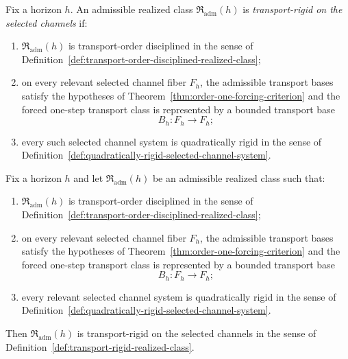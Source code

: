 \begin{definition}
\label{def:transport-rigid-realized-class}
Fix a horizon $h$. An admissible realized class
$\mathfrak R_{\mathrm{adm}}(h)$ is \emph{transport-rigid on the selected
channels} if:
\begin{enumerate}[label=(\roman*), leftmargin=2em, itemsep=0.2em]
\item $\mathfrak R_{\mathrm{adm}}(h)$ is transport-order disciplined in the
      sense of
      Definition~\ref{def:transport-order-disciplined-realized-class};
\item on every relevant selected channel fiber $F_h$, the admissible transport
      bases satisfy the hypotheses of
      Theorem~\ref{thm:order-one-forcing-criterion} and the forced one-step
      transport class is represented by a bounded transport base
      \[
      B_h:F_h\to F_h;
      \]
\item every such selected channel system is quadratically rigid in the sense
      of
      Definition~\ref{def:quadratically-rigid-selected-channel-system}.
\end{enumerate}
\end{definition}

\begin{corollary}
\label{cor:quadratically-rigid-implies-transport-rigid}
Fix a horizon $h$ and let $\mathfrak R_{\mathrm{adm}}(h)$ be an admissible
realized class such that:
\begin{enumerate}[label=(\roman*), leftmargin=2em, itemsep=0.2em]
\item $\mathfrak R_{\mathrm{adm}}(h)$ is transport-order disciplined in the
      sense of
      Definition~\ref{def:transport-order-disciplined-realized-class};
\item on every relevant selected channel fiber $F_h$, the admissible transport
      bases satisfy the hypotheses of
      Theorem~\ref{thm:order-one-forcing-criterion} and the forced one-step
      transport class is represented by a bounded transport base
      \[
      B_h:F_h\to F_h;
      \]
\item every relevant selected channel system is quadratically rigid in the
      sense of
      Definition~\ref{def:quadratically-rigid-selected-channel-system}.
\end{enumerate}
Then $\mathfrak R_{\mathrm{adm}}(h)$ is transport-rigid on the selected
channels in the sense of
Definition~\ref{def:transport-rigid-realized-class}.
\end{corollary}

